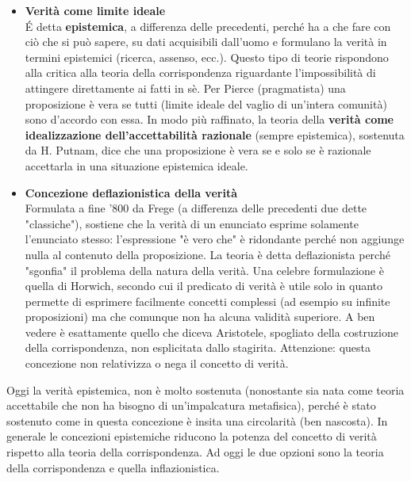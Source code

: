 \documentclass[10pt,a4paper]{article}
\begin{document}
\begin{itemize}
	\item \textbf{Verità come limite ideale}\\
	\'E detta \textbf{epistemica}, a differenza delle precedenti, perché ha a che fare con ciò che si può sapere, su dati acquisibili dall'uomo e formulano la verità in termini epistemici (ricerca, assenso, ecc.). Questo tipo di teorie rispondono alla critica alla teoria della corrispondenza riguardante l'impossibilità di attingere direttamente ai fatti in sè. Per Pierce (pragmatista) una proposizione è vera se tutti (limite ideale del vaglio di un'intera comunità) sono d'accordo con essa.	In modo più raffinato, la teoria della \textbf{verità come idealizzazione dell'accettabilità razionale} (sempre epistemica), sostenuta da H. Putnam, dice che una proposizione è vera se e solo se è razionale accettarla in una situazione epistemica ideale.
	\item \textbf{Concezione deflazionistica della verità}\\
	Formulata a fine '800 da Frege (a differenza delle precedenti due dette "classiche"), sostiene che la verità di un enunciato esprime solamente l'enunciato stesso: l'espressione "è vero che" è ridondante perché non aggiunge nulla al contenuto della proposizione. La teoria è detta deflazionista perché "sgonfia" il problema della natura della verità. Una celebre formulazione è quella di Horwich, secondo cui il predicato di verità è utile solo in quanto permette di esprimere facilmente concetti complessi (ad esempio su infinite proposizioni) ma che comunque non ha alcuna validità superiore. A ben vedere è esattamente quello che diceva Aristotele, spogliato della costruzione della corrispondenza, non esplicitata dallo stagirita. Attenzione: questa concezione non relativizza o nega il concetto di verità.
\end{itemize}
Oggi la verità epistemica, non è molto sostenuta (nonostante sia nata come teoria accettabile che non ha bisogno di un'impalcatura metafisica), perché è stato sostenuto come in questa concezione è insita una circolarità (ben nascosta). In generale le concezioni epistemiche riducono la potenza del concetto di verità rispetto alla teoria della corrispondenza. Ad oggi le due opzioni sono la teoria della corrispondenza e quella inflazionistica. 
\end{document}
